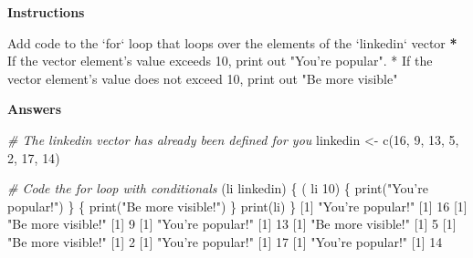 \documentclass[]{article}
\newcommand{\hlnum}[1]{\textcolor[rgb]{0.816,0.125,0.439}{#1}}%
\newcommand{\hlstr}[1]{\textcolor[rgb]{0.251,0.627,0.251}{#1}}%
\newcommand{\hlcom}[1]{\textcolor[rgb]{0.502,0.502,0.502}{\textit{#1}}}%
\newcommand{\hlstd}[1]{\textcolor[rgb]{0.251,0.251,0.251}{#1}}%
\newcommand{\hlkwc}[1]{\textcolor[rgb]{0.251,0.251,0.251}{#1}}%
\newcommand{\hlkwd}[1]{\textcolor[rgb]{0.878,0.439,0.125}{#1}}%
\newenvironment{Shaded}{\begin{myshaded}}{\end{myshaded}}
\newcommand{\KeywordTok}[1]{\hlkwd{#1}}
\newcommand{\DataTypeTok}[1]{\hlkwc{#1}}
\newcommand{\DecValTok}[1]{\hlnum{#1}}
\newcommand{\StringTok}[1]{\hlstr{#1}}
\newcommand{\CommentTok}[1]{\hlcom{#1}}
\newcommand{\ErrorTok}[1]{\textbf{{#1}}}
\newcommand{\NormalTok}[1]{\hlstd{#1}}
\begin{document}
\textbf{Instructions}

\begin{Shaded}
\begin{Highlighting}[]
\NormalTok{Add code to the }\StringTok{`}\DataTypeTok{for}\StringTok{`}\NormalTok{ loop that loops over the elements of the }\StringTok{`}\DataTypeTok{linkedin}\StringTok{`}\NormalTok{ vector}\OperatorTok{:}
\StringTok{  }
\StringTok{  }\ErrorTok{*}\StringTok{ }\NormalTok{If the vector element}\StringTok{'s value exceeds 10, print out "You'}\NormalTok{re popular}\OperatorTok{!}\StringTok{".}
\StringTok{* If the vector element's value does not exceed 10, print out "}\NormalTok{Be more visible}\OperatorTok{!}\StringTok{"}
\end{Highlighting}
\end{Shaded}

\textbf{Answers}

\begin{Shaded}
\begin{Highlighting}[]
\CommentTok{# The linkedin vector has already been defined for you}
\NormalTok{linkedin <-}\StringTok{ }\KeywordTok{c}\NormalTok{(}\DecValTok{16}\NormalTok{, }\DecValTok{9}\NormalTok{, }\DecValTok{13}\NormalTok{, }\DecValTok{5}\NormalTok{, }\DecValTok{2}\NormalTok{, }\DecValTok{17}\NormalTok{, }\DecValTok{14}\NormalTok{)}

\CommentTok{# Code the for loop with conditionals}
\NormalTok{ (li }\NormalTok{ linkedin) \{}
\NormalTok{ ( li }\OperatorTok{>}\StringTok{ }\DecValTok{10}\NormalTok{) \{}
\KeywordTok{print}\NormalTok{(}\StringTok{"You're popular!"}\NormalTok{)}
\NormalTok{\} }\NormalTok{ \{}
\KeywordTok{print}\NormalTok{(}\StringTok{"Be more visible!"}\NormalTok{)  }
\NormalTok{\}}
\KeywordTok{print}\NormalTok{(li)}
\NormalTok{\}}
\NormalTok{   [}\DecValTok{1}\NormalTok{] }\StringTok{"You're popular!"}
\NormalTok{   [}\DecValTok{1}\NormalTok{] }\DecValTok{16}
\NormalTok{   [}\DecValTok{1}\NormalTok{] }\StringTok{"Be more visible!"}
\NormalTok{   [}\DecValTok{1}\NormalTok{] }\DecValTok{9}
\NormalTok{   [}\DecValTok{1}\NormalTok{] }\StringTok{"You're popular!"}
\NormalTok{   [}\DecValTok{1}\NormalTok{] }\DecValTok{13}
\NormalTok{   [}\DecValTok{1}\NormalTok{] }\StringTok{"Be more visible!"}
\NormalTok{   [}\DecValTok{1}\NormalTok{] }\DecValTok{5}
\NormalTok{   [}\DecValTok{1}\NormalTok{] }\StringTok{"Be more visible!"}
\NormalTok{   [}\DecValTok{1}\NormalTok{] }\DecValTok{2}
\NormalTok{   [}\DecValTok{1}\NormalTok{] }\StringTok{"You're popular!"}
\NormalTok{   [}\DecValTok{1}\NormalTok{] }\DecValTok{17}
\NormalTok{   [}\DecValTok{1}\NormalTok{] }\StringTok{"You're popular!"}
\NormalTok{   [}\DecValTok{1}\NormalTok{] }\DecValTok{14}
\end{Highlighting}
\end{Shaded}
\end{document}
